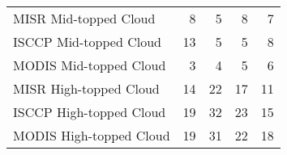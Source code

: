 \begin{tabular}{lrrrr}
   MISR Mid-topped Cloud &                        8 &                        5 &                        8 &                        7 \\
  ISCCP Mid-topped Cloud &                       13 &                        5 &                        5 &                        8 \\
  MODIS Mid-topped Cloud &                        3 &                        4 &                        5 &                        6 \\
  MISR High-topped Cloud &                       14 &                       22 &                       17 &                       11 \\
 ISCCP High-topped Cloud &                       19 &                       32 &                       23 &                       15 \\
 MODIS High-topped Cloud &                       19 &                       31 &                       22 &                       18 \\ \hline
\end{tabular}
